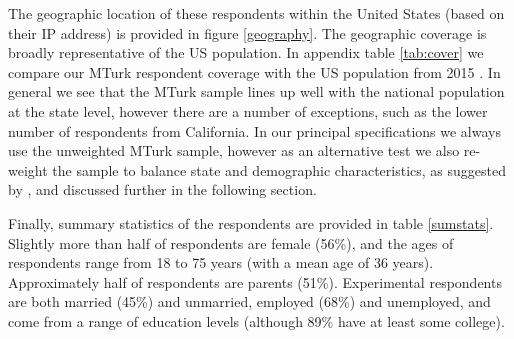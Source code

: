 \documentclass[a4paper, 11pt]{article}
\begin{document}
\begin{spacing}{1.4}
The geographic location of these respondents within the United States (based
on their IP address) is provided in figure \ref{geography}.  The geographic
coverage is broadly representative of the US population.  In appendix table
\ref{tab:cover} we compare our MTurk respondent coverage with the US population
from 2015 \citep{CensusBureau2015}.  In general we see that the MTurk sample
lines up well with the national population at the state level, however there
are a number of exceptions, such as the lower number of respondents from
California.  In our principal specifications we always use the unweighted
MTurk sample, however as an alternative test we also re-weight the sample
to balance state and demographic characteristics, as suggested by
\citet{Francis-TanMialon2015}, and discussed further in the following section.

Finally, summary statistics of the respondents are provided in table
\ref{sumstats}.  Slightly more than half of respondents are female (56\%),
and the ages of respondents range from 18 to 75 years (with a mean age of 36
years).  Approximately half of respondents are parents (51\%).  Experimental
respondents are both married (45\%) and unmarried, employed (68\%) and
unemployed, and come from a range of education levels (although 89\% have
at least some college).



\end{spacing}
\end{document}
